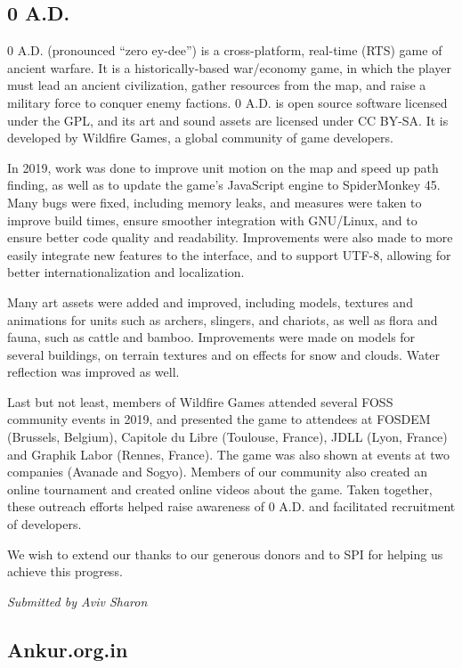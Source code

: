\documentclass[a4paper]{report}
\begin{document}
\subsection{0 A.D.}

0 A.D. (pronounced ``zero ey-dee'') is a cross-platform, real-time (RTS)
game of ancient warfare. It is a historically-based war/economy game, in
which the player must lead an ancient civilization, gather resources
from the map, and raise a military force to conquer enemy factions. 0
A.D.  is open source software licensed under the GPL, and its art and
sound assets are licensed under CC BY-SA. It is developed by Wildfire
Games, a global community of game developers.

In 2019, work was done to improve unit motion on the map and speed up
path finding, as well as to update the game's JavaScript engine to
SpiderMonkey 45.  Many bugs were fixed, including memory leaks, and
measures were taken to improve build times, ensure smoother integration
with GNU/Linux, and to ensure better code quality and readability.
Improvements were also made to more easily integrate new features to the
interface, and to support UTF-8, allowing for better
internationalization and localization.

Many art assets were added and improved, including models, textures and
animations for units such as archers, slingers, and chariots, as well as
flora and fauna, such as cattle and bamboo. Improvements were made on
models for several buildings, on terrain textures and on effects for
snow and clouds. Water reflection was improved as well.

Last but not least, members of Wildfire Games attended several FOSS
community events in 2019, and presented the game to attendees at FOSDEM
(Brussels, Belgium), Capitole du Libre (Toulouse, France), JDLL (Lyon,
France) and Graphik Labor (Rennes, France).  The game was also shown at
events at two companies (Avanade and Sogyo).  Members of our community
also created an online tournament and created online videos about the
game.  Taken together, these outreach efforts helped raise awareness of
0 A.D. and facilitated recruitment of developers.

We wish to extend our thanks to our generous donors and to SPI for
helping us achieve this progress.

{\em Submitted by Aviv Sharon}

\subsection{Ankur.org.in}
\end{document}
